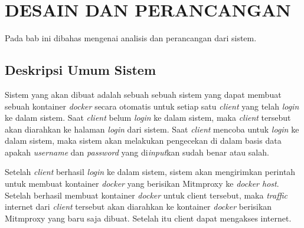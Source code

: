 \chapter{DESAIN DAN PERANCANGAN}
Pada bab ini dibahas mengenai analisis dan perancangan dari sistem. 
\section{Deskripsi Umum Sistem}    
Sistem yang akan dibuat adalah sebuah sebuah sistem yang dapat membuat sebuah kontainer \textit{docker} secara otomatis untuk setiap satu \textit{client} yang telah \textit{login} ke dalam sistem. Saat \textit{client} belum \textit{login} ke dalam sistem, maka \textit{client} tersebut akan diarahkan ke halaman \textit{login} dari sistem. Saat \textit{client} mencoba untuk \textit{login} ke dalam sistem, maka sistem akan melakukan pengecekan di dalam basis data apakah \textit{username} dan \textit{password} yang di\textit{input}kan sudah benar atau salah. 

Setelah \textit{client} berhasil \textit{login} ke dalam sistem, sistem akan mengirimkan perintah untuk membuat kontainer \textit{docker} yang berisikan Mitmproxy ke \textit{docker host}. Setelah berhasil membuat kontainer \textit{docker} untuk client tersebut, maka \textit{traffic} internet dari \textit{client} tersebut akan diarahkan ke kontainer \textit{docker} berisikan Mitmproxy yang baru saja dibuat. Setelah itu client dapat mengakses internet.

